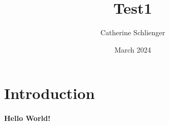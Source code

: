 \documentclass{article}
\title{Test1}
\author{Catherine Schlienger}
\date{March 2024}
\begin{document}
\maketitle

\section{Introduction}
\paragraph{Hello World!}
\end{document}
